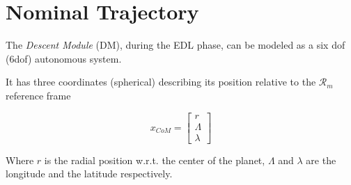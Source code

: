 \chapter{Nominal Trajectory}

The \textit{Descent Module} (DM), during the EDL phase, can be modeled as a
six dof (6dof) autonomous system.

It has three coordinates (spherical) describing its position relative to the
$\mathcal{R}_{m}$ reference frame

$$ x_{CoM} = \begin{bmatrix}
    r \\
    \Lambda \\
    \lambda
\end{bmatrix}$$

\noindent Where $r$ is the radial position w.r.t. the center of the planet, $\Lambda$ and $\lambda$ are 
the longitude and the latitude respectively.